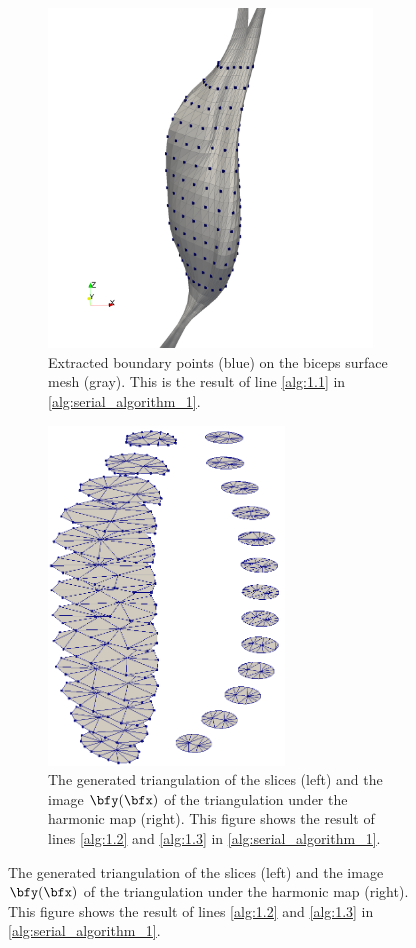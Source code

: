 %
\begin{figure}%
  \centering%
  \begin{subfigure}[t]{0.45\textwidth}%
    \centering%
    \includegraphics[height=9cm]{images/fiber_creation/serial_alg_0.png}%
    \caption{Extracted boundary points (blue) on the biceps surface mesh (gray). This is the result of line \ref{alg:1.1} in \cref{alg:serial_algorithm_1}.}%
    \label{fig:serial_alg_0}%
  \end{subfigure}
  \quad
  \begin{subfigure}[t]{0.51\textwidth}%
    \centering%
    \includegraphics[height=9cm]{images/fiber_creation/serial_alg_3.png}%
    \caption{The generated triangulation of the slices (left) and the image $\bfy(\bfx)$ of the triangulation under the harmonic map (right). This figure shows the result of lines \ref{alg:1.2} and \ref{alg:1.3} in \cref{alg:serial_algorithm_1}.}%

\end{subfigure}
\end{figure}
